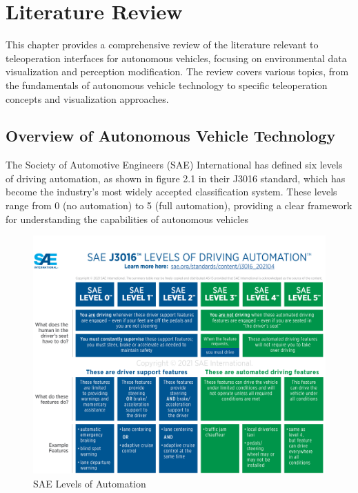 
\chapter{Literature Review}\label{chapter:literaturereview}
This chapter provides a comprehensive review of the literature relevant to teleoperation interfaces for autonomous vehicles, focusing on environmental data visualization and perception modification. The review covers various topics, from the fundamentals of autonomous vehicle technology to specific teleoperation concepts and visualization approaches.
\section{Overview of Autonomous Vehicle Technology}

The Society of Automotive Engineers (SAE) International has defined six levels of
driving automation, as shown in figure 2.1 in their J3016 standard, which has become
the industry’s most widely accepted classification system. These levels range from 0
(no automation) to 5 (full automation), providing a clear framework for understanding
the capabilities of autonomous vehicles \cite{sae2021}

\begin{figure}[h]
    \includegraphics[scale=0.4]{figures/SAE.png}
    \centering
    \caption{SAE Levels of Automation \cite{sae2021}}
    \label{fig:SAE}
\end{figure}

